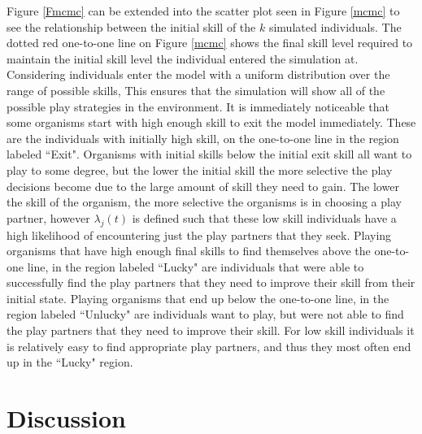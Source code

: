 \documentclass[12pt,letterpaper]{article}
\begin{document}
      Figure \ref{Fmcmc} can be extended into the scatter plot seen in Figure \ref{mcmc} to see the relationship between the initial skill of the $k$ simulated individuals. 
      The dotted red one-to-one line on Figure \ref{mcmc} shows the final skill level required to maintain the initial skill level the individual entered the simulation at.
      Considering individuals enter the model with a uniform distribution over the range of possible skills, This ensures that the simulation will show all of the possible play strategies in the environment.    
      It is immediately noticeable that some organisms start with high enough skill to exit the model immediately.
      These are the individuals with initially high skill, on the one-to-one line in the region labeled ``Exit".
      Organisms with initial skills below the initial exit skill all want to play to some degree, but the lower the initial skill the more selective the play decisions become due to the large amount of skill they need to gain.
      The lower the skill of the organism, the more selective the organisms is in choosing a play partner, however $\lambda_j(t)$ is defined such that these low skill individuals have a high likelihood of encountering just the play partners that they seek.
      Playing organisms that have high enough final skills to find themselves above the one-to-one line, in the region labeled ``Lucky" are individuals that were able to successfully find the play partners that they need to improve their skill from their initial state.
      Playing organisms that end up below the one-to-one line, in the region labeled ``Unlucky" are individuals want to play, but were not able to find the play partners that they need to improve their skill. %
      For low skill individuals it is relatively easy to find appropriate play partners, and thus they most often end up in the ``Lucky" region.
      

      
    \section{Discussion}
\end{document}
